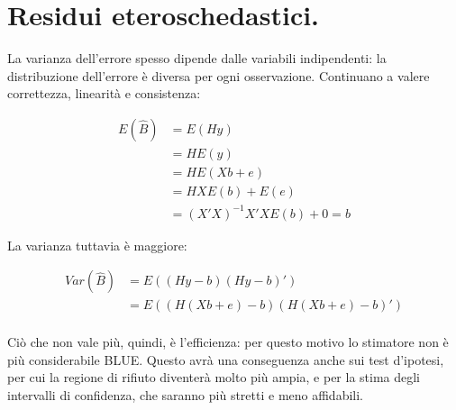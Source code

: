\documentclass[11pt, twocolumn]{article}
\begin{document}
\section{Residui eteroschedastici.}
La varianza dell'errore spesso dipende dalle variabili indipendenti: la distribuzione dell'errore è diversa per ogni osservazione.
Continuano a valere correttezza, linearità e consistenza:

\begin{align*}
  E(\hat{B}) &= E(Hy) \\
             &= H E(y) \\
             &= H E(Xb + e) \\
             &= H X E(b) + E(e) \\
             &= (X'X)^{-1}X'X E(b) + 0 = b
\end{align*}

La varianza tuttavia è maggiore:

\begin{align*}
  Var(\hat{B}) &= E((Hy - b)(Hy - b)') \\
               &= E((H(Xb + e) - b)(H(Xb + e) - b)') \\
\end{align*}

Ciò che non vale più, quindi, è l'efficienza: per questo motivo lo stimatore non è più considerabile BLUE. Questo avrà una conseguenza anche sui test d'ipotesi, per cui la regione di rifiuto diventerà molto più ampia, e per la stima degli intervalli di confidenza, che saranno più stretti e meno affidabili.
\end{document}
